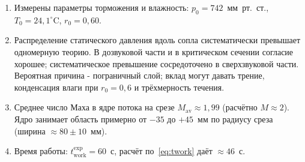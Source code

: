 \documentclass[12pt,a4paper]{article}
\begin{document}
\begin{enumerate}
    \item Измерены параметры торможения и влажность:
          $p_0 = 742$~мм~рт.~ст., $T_0 = 24{,}1^\circ$C, $r_0 = 0{,}60$.

    \item Распределение статического давления вдоль сопла систематически
          превышает одномерную теорию.
          В дозвуковой части и в критическом
          сечении согласие хорошее; систематическое превышение
          сосредоточено в сверхзвуковой части.
          Вероятная причина - пограничный слой; вклад могут давать трение, конденсация влаги при $r_0 = 0{,}6$
          и трёхмерность течения.

    \item Среднее число Маха в ядре потока на срезе
          $M_{\mathrm{av}} \approx 1{,}99$ (расчётно $M \approx 2$).
          Ядро занимает область примерно от $-35$ до $+45$~мм по радиусу
          среза (ширина $\approx 80 \pm 10$~мм).

    \item Время работы: $t_{\mathrm{work}}^{\mathrm{exp}} = 60$~с,
          расчёт по~\eqref{eq:twork} даёт $\approx 46$~с.
\end{enumerate}
\end{document}
